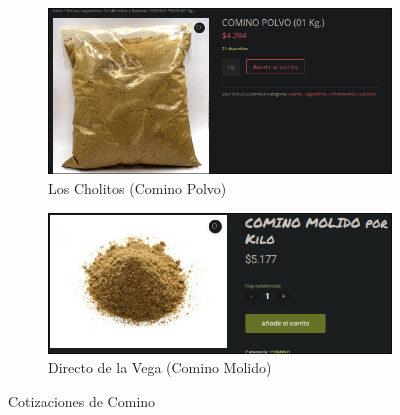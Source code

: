 \documentclass[12pt]{article}
\begin{document}
    \begin{figure}[H]
        \centering
        \begin{subfigure}{0.48\textwidth}
            \centering
            \includegraphics[width=\linewidth]{cholitos} %
            \caption{Los Cholitos (Comino Polvo)}
            \label{fig:los_cholitos_comino}
        \end{subfigure}
        \hfill
        \begin{subfigure}{0.48\textwidth}
            \centering
            \includegraphics[width=\linewidth]{comino} %
            \caption{Directo de la Vega (Comino Molido)}
            \label{fig:directo_de_la_vega_comino}
        \end{subfigure}
        \caption{Cotizaciones de Comino}
        \label{fig:cotizaciones_comino}
    \end{figure}
\end{document}
